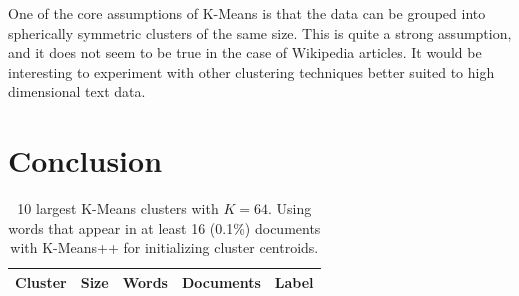 \documentclass{article} %
\begin{document}
One of the core assumptions of K-Means is that the data can be grouped into spherically symmetric clusters of the same size. This is quite a strong assumption, and it does not seem to be true in the case of Wikipedia articles. It would be interesting to experiment with other clustering techniques better suited to high dimensional text data. 



\section{Conclusion}



\begin{table}[t]
\caption{10 largest K-Means clusters with $K=64$. Using words that appear in at least 16 (0.1\%) documents with K-Means++ for initializing cluster centroids.}
\label{cluster-new-table}
\begin{center}
    \begin{tabular}{ | c | c | c | c | c | }
    \hline
    \textbf{Cluster} & \textbf{Size} & \textbf{Words} & \textbf{Documents} & \textbf{Label} \\ \hline
 

\end{tabular}
\end{center}
\end{table}
\end{document}
